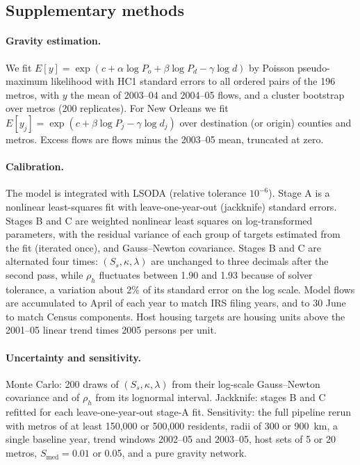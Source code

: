 \documentclass[11pt]{article}
\begin{document}
\subsection{Supplementary methods}\label{si:methods}
\paragraph{Gravity estimation.} We fit $E[y]=\exp(c+\alpha\log P_o+\beta\log P_d-\gamma\log d)$ by Poisson pseudo-maximum likelihood with HC1 standard errors to all ordered pairs of the 196 metros, with $y$ the mean of 2003--04 and 2004--05 flows, and a cluster bootstrap over metros (200 replicates). For New Orleans we fit $E[y_j]=\exp(c+\beta\log P_j-\gamma\log d_j)$ over destination (or origin) counties and metros. Excess flows are flows minus the 2003--05 mean, truncated at zero.

\paragraph{Calibration.} The model is integrated with LSODA (relative tolerance $10^{-6}$). Stage A is a nonlinear least-squares fit with leave-one-year-out (jackknife) standard errors. Stages B and C are weighted nonlinear least squares on log-transformed parameters, with the residual variance of each group of targets estimated from the fit (iterated once), and Gauss--Newton covariance. Stages B and C are alternated four times: $(S_s,\kappa,\lambda)$ are unchanged to three decimals after the second pass, while $\rho_h$ fluctuates between 1.90 and 1.93 because of solver tolerance, a variation about 2\% of its standard error on the log scale. Model flows are accumulated to April of each year to match IRS filing years, and to 30 June to match Census components. Host housing targets are housing units above the 2001--05 linear trend times 2005 persons per unit.

\paragraph{Uncertainty and sensitivity.} Monte Carlo: 200 draws of $(S_s,\kappa,\lambda)$ from their log-scale Gauss--Newton covariance and of $\rho_h$ from its lognormal interval. Jackknife: stages B and C refitted for each leave-one-year-out stage-A fit. Sensitivity: the full pipeline rerun with metros of at least 150{,}000 or 500{,}000 residents, radii of 300 or 900~km, a single baseline year, trend windows 2002--05 and 2003--05, host sets of 5 or 20 metros, $S_{\text{med}}=0.01$ or 0.05, and a pure gravity network.
\end{document}
